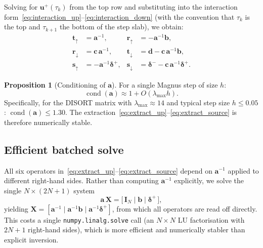 \documentclass[11pt,a4paper]{article}
\newcommand{\cond}{\operatorname{cond}}
\newcommand{\vect}[1]{\bm{#1}}
\newcommand{\mat}[1]{\mathbf{#1}}
\theoremstyle{definition}
\newtheorem{proposition}{Proposition}
\begin{document}
Solving for $\vect{u}^+(\tau_k)$ from the top row and substituting
into the interaction
form~\eqref{eq:interaction_up}--\eqref{eq:interaction_down}
(with the convention that $\tau_k$ is the top and $\tau_{k+1}$
the bottom of the step slab), we obtain:
\begin{align}
  \mat{t}_\uparrow   &= \mat{a}^{-1},
  &\mat{r}_\uparrow   &= -\mat{a}^{-1}\mat{b},
  \label{eq:extract_up}\\
  \mat{r}_\downarrow  &= \mat{c}\,\mat{a}^{-1},
  &\mat{t}_\downarrow  &= \mat{d}-\mat{c}\,\mat{a}^{-1}\mat{b},
  \label{eq:extract_down}\\
  \vect{s}_\uparrow   &= -\mat{a}^{-1}\vect{\delta}^+,
  &\vect{s}_\downarrow &= \vect{\delta}^-
                         - \mat{c}\,\mat{a}^{-1}\vect{\delta}^+.
  \label{eq:extract_source}
\end{align}

\begin{proposition}[Conditioning of $\mat{a}$]\label{prop:cond_a}
For a single Magnus step of size $h$:
\begin{equation}
  \cond(\mat{a}) \approx 1 + O(\lambda_{\max}h).
\end{equation}
Specifically, for the DISORT matrix with $\lambda_{\max}\approx 14$
and typical step size $h\leq 0.05$:
$\cond(\mat{a})\leq 1.30$.  The extraction~\eqref{eq:extract_up}--\eqref{eq:extract_source}
is therefore numerically stable.
\end{proposition}

\subsection{Efficient batched solve}\label{sec:batched_solve}

All six operators
in~\eqref{eq:extract_up}--\eqref{eq:extract_source} depend on
$\mat{a}^{-1}$ applied to different right-hand sides.  Rather than
computing $\mat{a}^{-1}$ explicitly, we solve the single
$N\!\times\!(2N\!+\!1)$ system
\begin{equation}\label{eq:batched_extract}
  \mat{a}\,\mat{X}
  = \bigl[\,\mat{I}_N \;\big|\; \mat{b} \;\big|\; \vect{\delta}^+\,\bigr],
\end{equation}
yielding
$\mat{X}=[\mat{a}^{-1}\mid\mat{a}^{-1}\mat{b}\mid\mat{a}^{-1}\vect{\delta}^+]$,
from which all operators are read off directly.  This costs a single
\texttt{numpy.linalg.solve} call (an $N\!\times\!N$ LU factorisation
with $2N\!+\!1$ right-hand sides), which is more efficient and
numerically stabler than explicit inversion.
\end{document}
